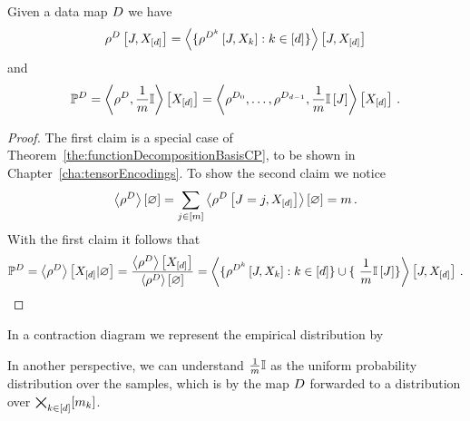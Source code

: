 \begin{theorem}\label{the:empCPRep}
	Given a data map $D$ we have
	\begin{align*}
		\rho^{D}\left[J,X_{[d]}\right]  
		= \left\langle 
		\{\rho^{D^{k}}\left[J,X_{k}\right] : k\in[d] \} 
		\right\rangle \left[ J,X_{[d]} \right] 
	\end{align*}
	and
	\begin{align*}
	\mathbb{P}^{D} = \left\langle \rho^{D}, \frac{1}{m}\mathbb{I}\right\rangle \left[ X_{[d]} \right] 
	= \left\langle \rho^{D_{0}},\ldots,\rho^{D_{d-1}}, \frac{1}{m}\mathbb{I}\left[J\right]\right\rangle \left[ X_{[d]} \right] \, . 
	\end{align*}
\end{theorem}
\begin{proof}
	The first claim is a special case of Theorem~\ref{the:functionDecompositionBasisCP}, to be shown in Chapter~\ref{cha:tensorEncodings}.
	To show the second claim we notice
		\[ \left\langle \rho^{D}\right\rangle \left[ \varnothing \right] = \sum_{j\in[m]} \left\langle \rho^{D}\left[J=j,X_{[d]}\right]\right\rangle \left[ \varnothing \right] = m \,  . \]
	With the first claim it follows that
	\begin{align*}
		\empdistribution 
		 = \sbnormationof{\datacore}{\shortcatvariables}
		 = \frac{\sbcontractionof{\datacore}{\shortcatvariables}}{\sbcontraction{\datacore}} 
		 =  \contractionof{
		\{\rencodingofat{\datamap^{\atomenumerator}}{\datvariable,\catvariableof{\atomenumerator}} : \atomenumeratorin \} \cup \{ \frac{1}{\datanum} \onesat{\datvariable} \}
		}{\datvariable,\shortcatvariables}  \, . 
	\end{align*}
\end{proof}

In a contraction diagram we represent the empirical distribution by
\begin{center}
	
\end{center}

In another perspective, we can understand $\frac{1}{m}\mathbb{I}$ as the uniform probability distribution over the samples, which is by the map $D$ forwarded to a distribution over $\bigtimes_{k\in[d]}[m_{k}]$.







